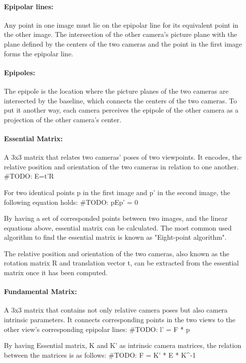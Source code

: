 \documentclass[11pt]{article}
\begin{document}
    \paragraph{Epipolar lines:} Any point in one image must lie on the epipolar line for its equivalent
    point in the other image. The intersection of the other camera's picture plane with the plane defined
    by the centers of the two cameras and the point in the first image forms the epipolar line.

    \paragraph{Epipoles:} The epipole is the location where the picture planes of the two cameras are
    intersected by the baseline, which connects the centers of the two cameras. To put it another way,
    each camera perceives the epipole of the other camera as a projection of the other camera's center.
    
    \paragraph{Essential Matrix:} A 3x3 matrix that relates two cameras' poses of two viewpoints. It encodes,
    the relative position and orientation of the two cameras in relation to one another.
    #TODO: E=t'R

    For two identical points p in the first image and p' in the second image, the following equation holds:
    #TODO: pEp' = 0

    By having a set of corresponded points between two images, and the linear equations above, essential matrix
    can be calculated. The most common used algorithm to find the essential matrix is known as "Eight-point algorithm".

    The relative position and orientation of the two cameras, also known as the rotation matrix R and translation
    vector t, can be extracted from the essential matrix once it has been computed.
    
    \paragraph{Fundamental Matrix:} A 3x3 matrix that contains not only relative camera poses but also
    camera intrinsic parameters. It connects corresponding points in the two views to the other view's
    corresponding epipolar lines:
    #TODO: l' = F * p


    By having Essential matrix, K and K' as intrinsic camera matrices, the relation between the matrices is as follows:
    #TODO: F = K' * E * K^-1
\end{document}
